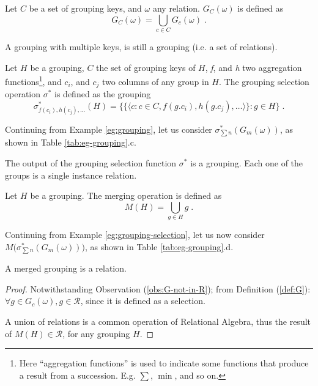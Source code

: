 \begin{definition}
Let $C$ be a set of grouping keys, and $\omega$ any relation.
$G_C(\omega)$ is defined as
$$
G_C(\omega) = \bigcup_{c \in C}G_c(\omega) \; .
$$
\end{definition}

\begin{observation}
A grouping with multiple keys, is still a grouping (i.e. a set of relations).
\end{observation}

\begin{definition}\label{def:sigma*}
Let $H$ be a grouping, $C$ the set of grouping keys of $H$, \emph{f}, and \emph{h} two aggregation functions\footnote{%
Here ``aggregation functions'' is used to indicate some functions that produce a result from a succession. E.g. $\sum$, $\min$, and so on.
}, and $c_i$, and $c_j$ two columns of any group in $H$.
The grouping selection operation $\sigma^*$ is defined as the grouping
$$
\sigma^*_{f(c_i), h(c_j), \dots}(H) = \Big\{
    \big\{ \langle c : c \in C, f(g.c_i), h(g.c_j), \dots \rangle \big\} : g \in H
\Big\} \; .
$$
\end{definition}

\begin{example}\label{eg:grouping-selection}
Continuing from Example \ref{eg:grouping}, let us consider $\sigma^*_{\sum{n}}(G_m(\omega))$, as shown in Table \ref{tab:eg-grouping}.c.
\end{example}

\begin{observation}
The output of the grouping selection function $\sigma^*$ is a grouping.
Each one of the groups is a single instance relation.
\end{observation}

\begin{definition}
Let $H$ be a grouping. The merging operation is defined as
$$
M(H) = \bigcup_{g \in H} g \; .
$$
\end{definition}

\begin{example}\label{eg:grouping-merge}
Continuing from Example \ref{eg:grouping-selection}, let us now consider $M\Big(\sigma^*_{\sum{n}}(G_m(\omega))\Big)$, as shown in Table \ref{tab:eg-grouping}.d.
\end{example}

\begin{proposition}
A merged grouping is a relation.
\end{proposition}
\begin{proof}
Notwithstanding Observation (\ref{obs:G-not-in-R}); from Definition (\ref{def:G}): $\forall g \in G_c(\omega), g \in \mathcal{R}$, since it is defined as a selection.

A union of relations is a common operation of Relational Algebra, thus the result of $M(H) \in \mathcal{R}$, for any grouping $H$. 
\end{proof}
